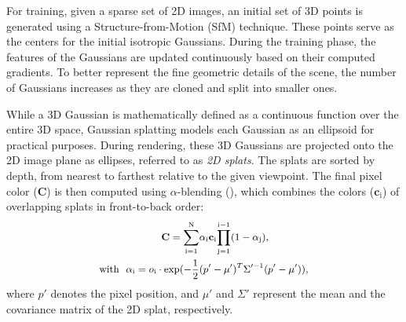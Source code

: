 For training, given a sparse set of 2D images, an initial set of 3D points is
generated using a Structure-from-Motion (SfM) technique. These points serve as
the centers for the initial isotropic Gaussians.
%
During the training phase, the features of the Gaussians are updated
continuously based on their computed gradients. To better represent the fine
geometric details of the scene, the number of Gaussians increases as they are
cloned and split into smaller ones.

While a 3D Gaussian is mathematically defined as a continuous function
over the entire 3D space, Gaussian splatting models each Gaussian as an
ellipsoid for practical purposes.
%
During rendering, these 3D Gaussians are projected onto the 2D image plane as
ellipses, referred to as \emph{2D splats}. 
%
The splats are sorted by depth, from nearest to farthest relative to the given
viewpoint. The final pixel color ($\mathbf{{C}}$) is then computed using
$\alpha$-blending (), which combines the colors
($\mathrm{\mathbf{c}_i}$) of overlapping splats in front-to-back order:
%
\begin{equation}
\small
\begin{aligned}
  \mathbf{{C}} = \mathrm{\sum\limits_{i=1}^{N}} &\mathrm{\alpha_i\mathbf{c}_i} \mathrm{\prod_{j=1}^{i-1}} \mathrm{(1-\alpha_j)}, \\
  \textrm{with}~~\mathrm{\alpha_i} = o_\mathrm{i} \cdot \mathrm{exp}(-\frac{1}{2}&({p'}-\mu')^T\Sigma'^{-1}({p'}-\mu')),
  \label{eqn:volumerender} 
\end{aligned}
\end{equation}
%
where ${p'}$ denotes the pixel position, and $\mu'$ and $\Sigma'$ represent the
mean and the covariance matrix of the 2D splat, respectively.

